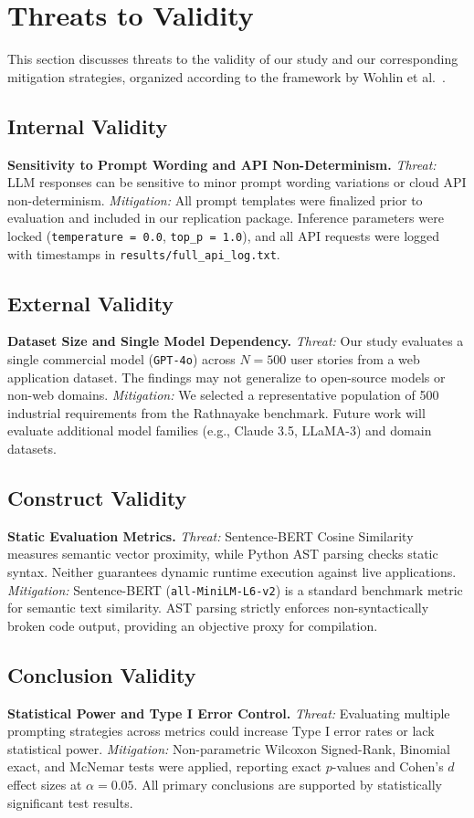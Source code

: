 \section{Threats to Validity}
\label{sec:threats}

This section discusses threats to the validity of our study and our corresponding mitigation strategies, organized according to the framework by Wohlin et al.~\cite{wohlin2012experimentation}.

\subsection{Internal Validity}
\textbf{Sensitivity to Prompt Wording and API Non-Determinism.}
\textit{Threat:} LLM responses can be sensitive to minor prompt wording variations or cloud API non-determinism.
\textit{Mitigation:} All prompt templates were finalized prior to evaluation and included in our replication package. Inference parameters were locked (\texttt{temperature = 0.0}, \texttt{top\_p = 1.0}), and all API requests were logged with timestamps in \texttt{results/full\_api\_log.txt}.

\subsection{External Validity}
\textbf{Dataset Size and Single Model Dependency.}
\textit{Threat:} Our study evaluates a single commercial model (\texttt{GPT-4o}) across $N=500$ user stories from a web application dataset. The findings may not generalize to open-source models or non-web domains.
\textit{Mitigation:} We selected a representative population of 500 industrial requirements from the Rathnayake benchmark. Future work will evaluate additional model families (e.g., Claude 3.5, LLaMA-3) and domain datasets.

\subsection{Construct Validity}
\textbf{Static Evaluation Metrics.}
\textit{Threat:} Sentence-BERT Cosine Similarity measures semantic vector proximity, while Python AST parsing checks static syntax. Neither guarantees dynamic runtime execution against live applications.
\textit{Mitigation:} Sentence-BERT (\texttt{all-MiniLM-L6-v2}) is a standard benchmark metric for semantic text similarity. AST parsing strictly enforces non-syntactically broken code output, providing an objective proxy for compilation.

\subsection{Conclusion Validity}
\textbf{Statistical Power and Type I Error Control.}
\textit{Threat:} Evaluating multiple prompting strategies across metrics could increase Type I error rates or lack statistical power.
\textit{Mitigation:} Non-parametric Wilcoxon Signed-Rank, Binomial exact, and McNemar tests were applied, reporting exact $p$-values and Cohen's $d$ effect sizes at $\alpha = 0.05$. All primary conclusions are supported by statistically significant test results.
